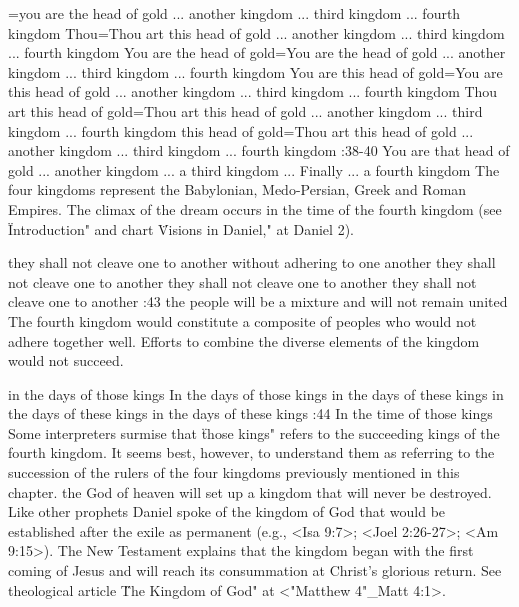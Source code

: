={you are the head of gold ... another kingdom ... third kingdom ... fourth kingdom} %
    {Thou}={Thou art this head of gold ... another kingdom ... third kingdom ... fourth kingdom} %
    {You are the head of gold}={You are the head of gold ... another kingdom ... third kingdom ... fourth kingdom} %
    {You are this head of gold}={You are this head of gold ... another kingdom ... third kingdom ... fourth kingdom} %
    {Thou art this head of gold}={Thou art this head of gold ... another kingdom ... third kingdom ... fourth kingdom} %
    {this head of gold}={Thou art this head of gold ... another kingdom ... third kingdom ... fourth kingdom} %
:38-40 {You are that head of gold ... another kingdom ... a third kingdom ... Finally ... a fourth kingdom} 
The four kingdoms represent the Babylonian,
Medo-Persian, Greek and Roman Empires. The climax of the dream occurs in the time of the fourth 
kingdom (see \"Introduction" and chart \"Visions in Daniel," at Daniel 2).

    {they shall not cleave one to another} %
    {without adhering to one another} %
    {they shall not cleave one to another} %
    {they shall not cleave one to another} %
    {they shall not cleave one to another} %
:43 {the people will be a mixture and will not remain united}
The fourth kingdom would constitute a composite of peoples who 
would not adhere together well. Efforts to combine the diverse elements of the kingdom would not
succeed.



    {in the days of those kings} %
    {In the days of those kings} %
    {in the days of these kings} %
    {in the days of these kings} %
    {in the days of these kings} %
:44 {In the time of those kings} Some interpreters surmise that 
 \"those kings" refers to the succeeding kings of the fourth kingdom. 
It seems best, however, to understand them as referring to the succession of the rulers of the four
kingdoms previously mentioned in  
this chapter. the God of heaven will set up a kingdom that will 
never be destroyed. Like other prophets Daniel spoke of the 
kingdom of God that would be established after the exile as permanent (e.g., <Isa 9:7>; <Joel 2:26-27>;
<Am 9:15>). The New Testament  
explains that the kingdom began with the first coming of Jesus and 
will reach its consummation at Christ's glorious return. See theological article \"The Kingdom of
God" at <"Matthew 4"_Matt 4:1>. 

